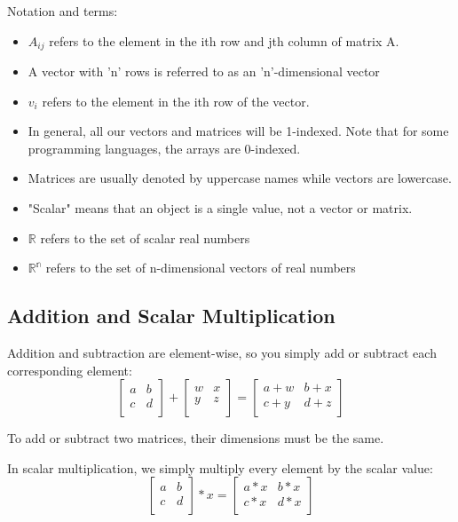 \documentclass{article}
\begin{document}
Notation and terms:
\begin{itemize}
  \item $A_{ij}$ refers to the element in the ith row and jth column of matrix A.
  \item A vector with 'n' rows is referred to as an 'n'-dimensional vector
  \item $v_i$ refers to the element in the ith row of the vector.
  \item In general, all our vectors and matrices will be 1-indexed. Note that for some programming languages, the arrays are 0-indexed.
  \item Matrices are usually denoted by uppercase names while vectors are lowercase.
  \item "Scalar" means that an object is a single value, not a vector or matrix.
  \item $\mathbb{R}$ refers to the set of scalar real numbers
  \item $\mathbb{R^n}$ refers to the set of n-dimensional vectors of real numbers
\end{itemize}

\subsection{Addition and Scalar Multiplication}
Addition and subtraction are element-wise, so you simply add or subtract each corresponding element:
$$\begin{bmatrix}  a & b \\   c & d \\  \end{bmatrix} +\begin{bmatrix}  w & x \\   y & z \\  \end{bmatrix} =\begin{bmatrix}  a+w & b+x \\   c+y & d+z \\ \end{bmatrix}$$

To add or subtract two matrices, their dimensions must be the same.

In scalar multiplication, we simply multiply every element by the scalar value:
$$\begin{bmatrix}  a & b \\   c & d \\  \end{bmatrix} * x =\begin{bmatrix}  a*x & b*x \\   c*x & d*x \\ \end{bmatrix}$$
\end{document}
